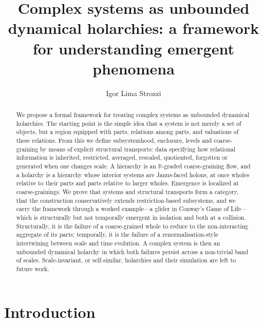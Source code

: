 \documentclass[runningheads]{llncs}
\newcommand{\R}{\mathbb{R}}
\begin{document}
\title{Complex systems as unbounded dynamical holarchies: a framework for understanding emergent phenomena}
\author{Igor Lima Strozzi}
\maketitle

\begin{abstract}
We propose a formal framework for treating complex systems as unbounded dynamical holarchies. The starting point is the simple idea that a system is not merely a set of objects, but a region equipped with parts, relations among parts, and valuations of these relations. From this we define subsystemhood, enclosure, levels and coarse-graining by means of explicit structural transports: data specifying how relational information is inherited, restricted, averaged, rescaled, quotiented, forgotten or generated when one changes scale. A hierarchy is an $\R$-graded coarse-graining flow, and a holarchy is a hierarchy whose interior systems are Janus-faced holons, at once wholes relative to their parts and parts relative to larger wholes. Emergence is localized at coarse-grainings. We prove that systems and structural transports form a category, that the construction conservatively extends restriction-based subsystems, and we carry the framework through a worked example---a glider in Conway's Game of Life---which is structurally but not temporally emergent in isolation and both at a collision. Structurally, it is the failure of a coarse-grained whole to reduce to the non-interacting aggregate of its parts; temporally, it is the failure of a renormalisation-style intertwining between scale and time evolution. A complex system is then an unbounded dynamical holarchy in which both failures persist across a non-trivial band of scales. Scale-invariant, or self-similar, holarchies and their simulation are left to future work.
\end{abstract}

\section{Introduction}
\end{document}
